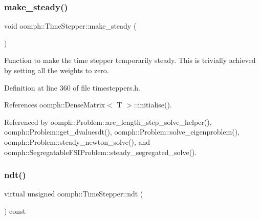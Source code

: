 \mbox{\label{classoomph_1_1TimeStepper_a81ea0ff2e66cef5e0184b616c608e418}} 
\subsubsection{\texorpdfstring{make\+\_\+steady()}{make\_steady()}}
{\footnotesize\ttfamily void oomph\+::\+Time\+Stepper\+::make\+\_\+steady (\begin{DoxyParamCaption}{ }\end{DoxyParamCaption})\hspace{0.3cm}{\ttfamily [inline]}}



Function to make the time stepper temporarily steady. This is trivially achieved by setting all the weights to zero. 



Definition at line 360 of file timesteppers.\+h.



References oomph\+::\+Dense\+Matrix$<$ T $>$\+::initialise().



Referenced by oomph\+::\+Problem\+::arc\+\_\+length\+\_\+step\+\_\+solve\+\_\+helper(), oomph\+::\+Problem\+::get\+\_\+dvaluesdt(), oomph\+::\+Problem\+::solve\+\_\+eigenproblem(), oomph\+::\+Problem\+::steady\+\_\+newton\+\_\+solve(), and oomph\+::\+Segregatable\+F\+S\+I\+Problem\+::steady\+\_\+segregated\+\_\+solve().

\mbox{\label{classoomph_1_1TimeStepper_a00e57b6436cff4fc82af481b81a78a1a}} 
\subsubsection{\texorpdfstring{ndt()}{ndt()}}
{\footnotesize\ttfamily virtual unsigned oomph\+::\+Time\+Stepper\+::ndt (\begin{DoxyParamCaption}{ }\end{DoxyParamCaption}) const\hspace{0.3cm}{\ttfamily [pure virtual]}}




